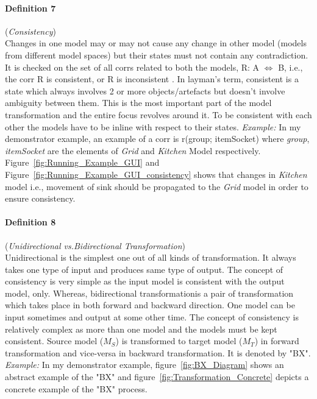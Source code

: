 \paragraph{Definition 7} (\textit{Consistency})\\ 
Changes in one model may or may not cause any change in other model (models from different model spaces) but their states must not contain any contradiction. It is checked on the set of all corrs related to both the models, R: A $\Longleftrightarrow$ B, i.e., the corr R is consistent, or R is inconsistent \cite{benchmarx-reload}.
\newline\newline In layman's term, consistent is a state which always involves 2 or more objects/artefacts but doesn't involve ambiguity between them. This is the most important part of the model transformation and the entire focus revolves around it. To be consistent with each other the models have to be inline with respect to their states. 
\newline\newline\textit{Example:} In my demonstrator example, an example of a corr is r(group; itemSocket) where \textit{group}, \textit{itemSocket} are the elements of \textit{Grid} and \textit{Kitchen} Model respectively. Figure~\ref{fig:Running_Example_GUI} and Figure~\ref{fig:Running_Example_GUI_consistency} shows that changes in \textit{Kitchen} model i.e., movement of sink should be propagated to the \textit{Grid} model in order to ensure consistency.

\paragraph{Definition 8} (\textit{Unidirectional vs.Bidirectional Transformation})\\ 
Unidirectional is the simplest one out of all kinds of transformation. It always takes one type of input and produces same type of output. The concept of consistency is very simple as the input model is consistent with the output model, only.
\newline Whereas, bidirectional transformationis a pair of transformation which takes place in both forward and backward direction. One model can be input sometimes and output at some other time. The concept of consistency is relatively complex as more than one model and the models must be kept consistent. Source model ($M_{S}$) is transformed to target model ($M_{T}$) in forward transformation and vice-versa in backward transformation. It is denoted by "BX". 
\newline\newline\textit{Example:} In my demonstrator example, figure~\ref{fig:BX_Diagram} shows an abstract example of the "BX" and figure~\ref{fig:Transformation_Concrete} depicts a concrete example of the "BX" process.

